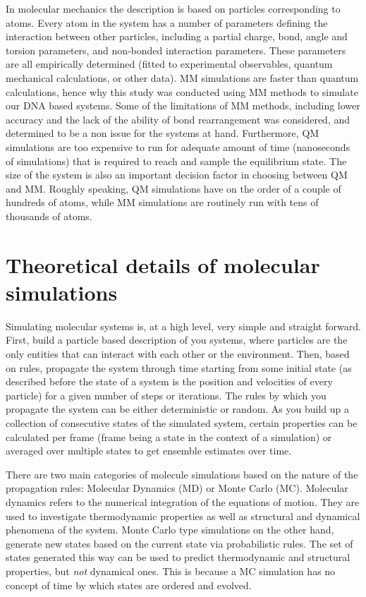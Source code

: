 \documentclass{report}
\begin{document}
In molecular mechanics the description is based on particles corresponding to atoms. Every atom in the system has a number of parameters defining the interaction between other particles, including a partial charge, bond, angle and torsion parameters, and non-bonded interaction parameters. These parameters are all empirically determined (fitted to experimental observables, quantum mechanical calculations, or other data). MM simulations are faster than quantum calculations, hence why this study was conducted using MM methods to simulate our DNA based systems. Some of the limitations of MM methods, including lower accuracy and the lack of the ability of bond rearrangement was considered, and determined to be a non issue for the systems at hand. Furthermore, QM simulations are too expensive to run for adequate amount of time (nanoseconds of simulations) that is required to reach and sample the equilibrium state. The size of the system is also an important decision factor in choosing between QM and MM. Roughly speaking, QM simulations have on the order of a couple of hundreds of atoms, while MM simulations are routinely run with tens of thousands of atoms.

\section{Theoretical details of molecular simulations}

Simulating molecular systems is, at a high level, very simple and straight forward. First, build a particle based description of you systems, where particles are the only entities that can interact with each other or the environment. Then, based on rules, propagate the system through time starting from some initial state (as described before the state of a system is the position and velocities of every particle) for a given number of steps or iterations. The rules by which you propagate the system can be either deterministic or random. As you build up a collection of consecutive states of the simulated system, certain properties can be calculated per frame (frame being a state in the context of a simulation) or averaged over multiple states to get ensemble estimates over time. 

There are two main categories of molecule simulations based on the nature of the propagation rules: Molecular Dynamics (MD) or Monte Carlo (MC). Molecular dynamics refers to the numerical integration of the equations of motion. They are used to investigate thermodynamic properties as well as structural and dynamical phenomena of the system. Monte Carlo type simulations on the other hand, generate new states based on the current state via probabilistic rules. The set of states generated this way can be used to predict thermodynamic and structural properties, but \emph{not} dynamical ones. This is because a MC simulation has no concept of time by which states are ordered and evolved.
\end{document}

